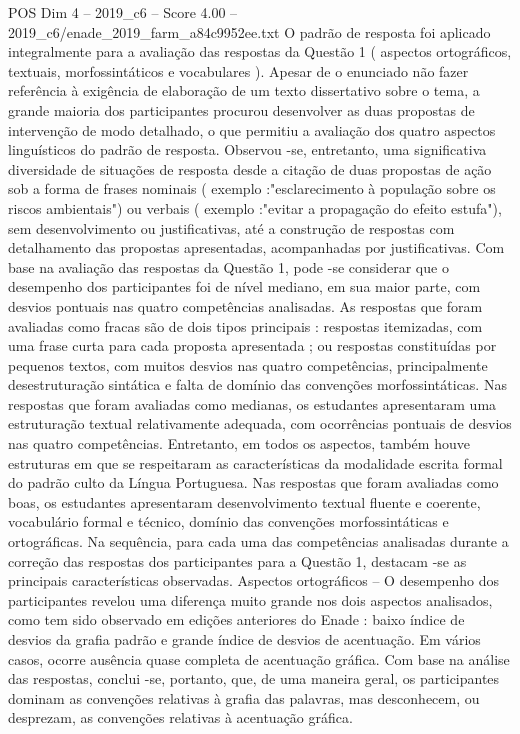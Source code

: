 \begin{textsample}{POS Dim 4 – 2019\_c6 – Score 4.00 – 2019\_c6/enade\_2019\_farm\_a84c9952ee.txt}
O padrão de resposta foi aplicado integralmente para a avaliação das respostas da Questão 1 ( aspectos ortográficos, textuais, morfossintáticos e vocabulares ).
Apesar de o enunciado não fazer referência à exigência de elaboração de um texto dissertativo sobre o tema, a grande maioria dos participantes procurou desenvolver as duas propostas de intervenção de modo detalhado, o que permitiu a avaliação dos quatro aspectos linguísticos do padrão de resposta.
Observou -se, entretanto, uma significativa diversidade de situações de resposta desde a citação de duas propostas de ação sob a forma de frases nominais ( exemplo :"esclarecimento à população sobre os riscos ambientais") ou verbais ( exemplo :"evitar a propagação do efeito estufa"), sem desenvolvimento ou justificativas, até a construção de respostas com detalhamento das propostas apresentadas, acompanhadas por justificativas.
Com base na avaliação das respostas da Questão 1, pode -se considerar que o desempenho dos participantes foi de nível mediano, em sua maior parte, com desvios pontuais nas quatro competências analisadas.
As respostas que foram avaliadas como fracas são de dois tipos principais : respostas itemizadas, com uma frase curta para cada proposta apresentada ; ou respostas constituídas por pequenos textos, com muitos desvios nas quatro competências, principalmente desestruturação sintática e falta de domínio das convenções morfossintáticas.
Nas respostas que foram avaliadas como medianas, os estudantes apresentaram uma estruturação textual relativamente adequada, com ocorrências pontuais de desvios nas quatro competências.
Entretanto, em todos os aspectos, também houve estruturas em que se respeitaram as características da modalidade escrita formal do padrão culto da Língua Portuguesa.
Nas respostas que foram avaliadas como boas, os estudantes apresentaram desenvolvimento textual fluente e coerente, vocabulário formal e técnico, domínio das convenções morfossintáticas e ortográficas.
Na sequência, para cada uma das competências analisadas durante a correção das respostas dos participantes para a Questão 1, destacam -se as principais características observadas.
Aspectos ortográficos – O desempenho dos participantes revelou uma diferença muito grande nos dois aspectos analisados, como tem sido observado em edições anteriores do Enade : baixo índice de desvios da grafia padrão e grande índice de desvios de acentuação.
Em vários casos, ocorre ausência quase completa de acentuação gráfica.
Com base na análise das respostas, conclui -se, portanto, que, de uma maneira geral, os participantes dominam as convenções relativas à grafia das palavras, mas desconhecem, ou desprezam, as convenções relativas à acentuação gráfica.

\end{textsample}

